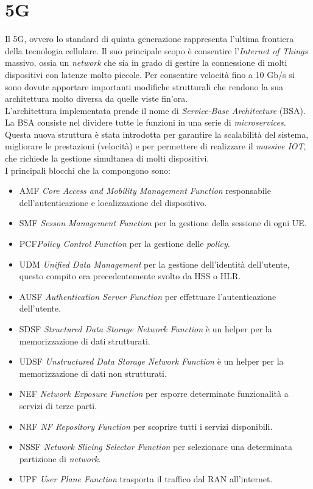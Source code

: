 \section{5G}
Il 5G, ovvero lo standard di quinta generazione rappresenta l'ultima frontiera della tecnologia cellulare.
Il suo principale scopo è consentire l'\textit{Internet of Things} massivo, ossia un \textit{network} che sia 
in grado di gestire la connessione di molti dispositivi con latenze molto piccole.
Per consentire velocità fino a 10 Gb/s si sono
dovute apportare importanti modifiche strutturali che rendono la sua architettura molto diversa da quelle viste fin'ora.\\
L'architettura implementata prende il nome di \textit{Service-Base Architecture} (BSA).
La BSA consiste nel dividere tutte le funzioni in una serie di \textit{microservices}\cite{5g-approach}. 
Questa nuova struttura è stata introdotta per garantire la scalabilità del sistema, migliorare le prestazioni (velocità) e per 
permettere di realizzare il \textit{massive IOT}, che richiede la gestione simultanea di molti dispositivi.\\
I principali blocchi che la compongono sono:
\begin{itemize}
    \item AMF \textit{Core Access and Mobility Management Function} responsabile dell'autenticazione e localizzazione del dispositivo.
    \item SMF \textit{Sesson Management Function} per la gestione della sessione di ogni UE.
    \item PCF\textit{Policy Control Function} per la gestione delle \textit{policy}.
    \item UDM \textit{Unified Data Management} per la gestione dell'identità dell'utente, questo compito era precedentemente svolto da HSS o HLR.
    \item AUSF \textit{Authentication Server Function} per effettuare l'autenticazione dell'utente.
    \item SDSF \textit{Structured Data Storage Network Function} è un helper per la memorizzazione di dati strutturati.
    \item UDSF \textit{Unstructured Data Storage Network Function} è un helper per la memorizzazione di dati non strutturati.
    \item NEF \textit{Network Exposure Function} per esporre determinate funzionalità a servizi di terze parti.
    \item NRF \textit{NF Repository Function} per scoprire tutti i servizi disponibili.
    \item NSSF \textit{Network Slicing Selector Function} per selezionare una determinata partizione di \textit{network}.
    \item UPF \textit{User Plane Function} trasporta il traffico dal RAN all'internet.
\end{itemize}
